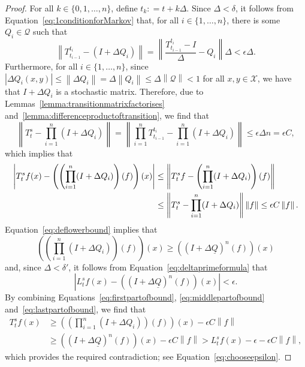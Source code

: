 \documentclass[a4paper,reqno]{amsart}
\newcommand{\states}{\mathcal{X}}
\newcommand{\lbound}{L}
\newcommand{\rateset}{\mathcal{Q}}
\newcommand{\lrate}{\underline{Q}}
\newcommand{\norm}[1]{\left\lVert #1 \right\rVert}
\newcommand{\abs}[1]{\left\vert #1 \right\vert}
\newcommand{\coloneqq}{:\!=}
\begin{document}
\begin{proof}
For all $k\in\{0,1,\dots,n\}$, define $t_k\coloneqq t+k\Delta$. Since $\Delta<\delta$, it follows from Equation~\eqref{eq:1conditionforMarkov} that, for all $i\in\{1,\dots,n\}$, there is some $Q_i\in\rateset$ such that 
\begin{equation*}
\norm{T_{t_{i-1}}^{t_i}-(I+\Delta Q_i)}
=\norm{\frac{T_{t_{i-1}}^{t_i}-I}{\Delta}-Q_i}\Delta
<\epsilon\Delta.
\end{equation*}
Furthermore, for all $i\in\{1,\dots,n\}$, since $\abs{\Delta Q_i(x,y)}\leq\norm{\Delta Q_i}=\Delta\norm{Q_i}\leq\Delta\norm{\rateset}<1$ for all $x,y\in\states$, we have that $I+\Delta Q_i$ is a stochastic matrix.
Therefore, due to Lemmas~\ref{lemma:transitionmatrixfactorises} and~\ref{lemma:differenceproductoftransition}, we find that
\begin{equation*}
\norm{T_t^s-\prod_{i=1}^n(I+\Delta Q_i)}
=\norm{\prod_{i=1}^n T_{t_{i-1}}^{t_i}-\prod_{i=1}^n(I+\Delta Q_i)}
\leq\epsilon\Delta n=\epsilon C,
\end{equation*}
which implies that
\begin{align}
\abs{T_t^sf(x)-\left(\left(\prod_{i=1}^n(I+\Delta Q_i)\right)(f)\right)(x)}
&\leq
\norm{T_t^sf-\left(\prod_{i=1}^n(I+\Delta Q_i)\right)(f)}\notag\\
&\leq
\norm{T_t^s-\prod_{i=1}^n(I+\Delta Q_i)}\norm{f}
\leq\epsilon C\norm{f}.\label{eq:firstpartofbound}
\end{align}
\noindent
Equation~\eqref{eq:deflowerbound} implies that
\begin{equation}
\left(\left(\prod_{i=1}^n(I+\Delta Q_i)\right)(f)\right)(x)
\geq
\left((I+\Delta\lrate)^n(f)\right)(x)\label{eq:middlepartofbound}
\end{equation}
and, since $\Delta<\delta'$, it follows from Equation~\eqref{eq:deltaprimeformula} that
\begin{equation}\label{eq:lastpartofbound}
\abs{\lbound_t^sf(x) - \left((I+\Delta\lrate)^n(f)\right)(x)}<\epsilon.
\end{equation}
\noindent
By combining Equations~\eqref{eq:firstpartofbound}, \eqref{eq:middlepartofbound} and~\eqref{eq:lastpartofbound}, we find that
\begin{align*}
T_t^sf(x)
&\geq
\left(\left(\prod_{i=1}^n(I+\Delta Q_i)\right)(f)\right)(x)-\epsilon C\norm{f}\\
&\geq
\left((I+\Delta\lrate)^n(f)\right)(x)-\epsilon C\norm{f}
>\lbound_t^sf(x)-\epsilon-\epsilon C\norm{f},
\end{align*}
which provides the required contradiction; see Equation~\eqref{eq:chooseepsilon}.
\end{proof}
\end{document}
